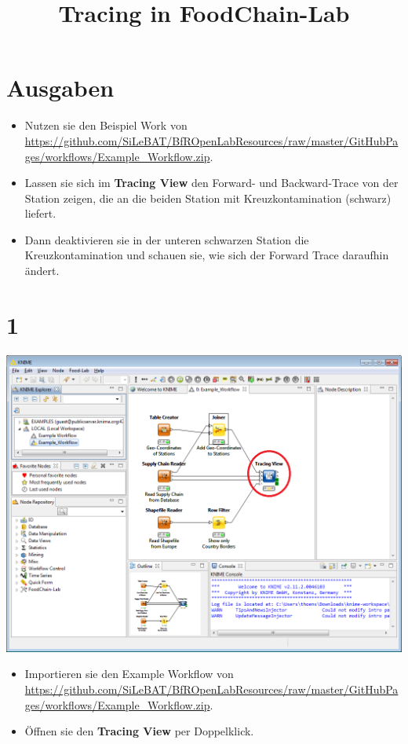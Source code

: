 \documentclass{beamer}
\title{Tracing in FoodChain-Lab}
\date{}
\begin{document}
\maketitle

\section{Ausgaben}
\begin{frame}
	\begin{itemize}
		\item Nutzen sie den Beispiel Work von \url{https://github.com/SiLeBAT/BfROpenLabResources/raw/master/GitHubPages/workflows/Example_Workflow.zip}.
		\item Lassen sie sich im \textbf{Tracing View} den Forward- und Backward-Trace von der Station zeigen, die an die beiden Station mit Kreuzkontamination (schwarz) liefert.
		\item Dann deaktivieren sie in der unteren schwarzen Station die Kreuzkontamination und schauen sie, wie sich der Forward Trace daraufhin ändert.
	\end{itemize}
\end{frame}
 
\section{1}
\begin{frame}
	\begin{center}
  		\includegraphics[height=0.6\textheight]{1.png}
	\end{center}
	\begin{itemize}
		\item Importieren sie den Example Workflow von \url{https://github.com/SiLeBAT/BfROpenLabResources/raw/master/GitHubPages/workflows/Example_Workflow.zip}.
		\item Öffnen sie den \textbf{Tracing View} per Doppelklick.
	\end{itemize}
\end{frame}
\end{document}
